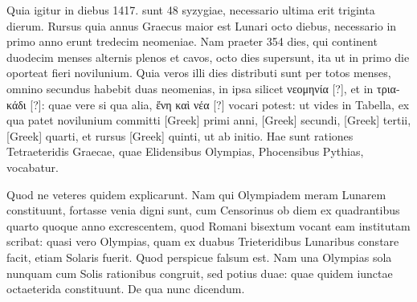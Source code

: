 Quia
igitur in diebus 1417. sunt 48 syzygiae, necessario
ultima erit triginta dierum.
Rursus quia annus
Graecus maior est Lunari octo diebus, necessario
in primo anno erunt tredecim neomeniae.
Nam
praeter 354 dies, qui continent duodecim menses
alternis plenos et cavos, octo dies supersunt, ita ut
in primo die oporteat fieri novilunium.
Quia veros
illi dies distributi sunt per totos menses, omnino
secundus habebit duas neomenias, in ipsa silicet
\textgreek{νεομηνία [?]}, et in \textgreek{τριακάδι [?]}: quae vere si qua alia,
\textgreek{ἔνη καὶ νέα [?]} vocari potest: ut vides in Tabella, ex qua
patet novilunium committi \textgreek{[Greek]} primi
anni, \textgreek{[Greek]} secundi, \textgreek{[Greek]}
tertii, \textgreek{[Greek]} quarti, et rursus \textgreek{[Greek]}
quinti, ut ab initio.
Hae sunt rationes Tetraeteridis Graecae,
quae Elidensibus Olympias, Phocensibus Pythias, vocabatur.

Quod ne veteres quidem explicarunt.
Nam qui Olympiadem meram
Lunarem constituunt, fortasse venia digni sunt, cum Censorinus ob
diem ex quadrantibus quarto quoque anno excrescentem, quod Romani
bisextum vocant eam institutam scribat:
quasi vero Olympias,
quam ex duabus Trieteridibus Lunaribus constare facit, etiam Solaris
fuerit.
Quod perspicue falsum est.
Nam una Olympias sola nunquam
cum Solis rationibus congruit, sed potius duae: quae quidem iunctae
octaeterida constituunt.
De qua nunc dicendum.

